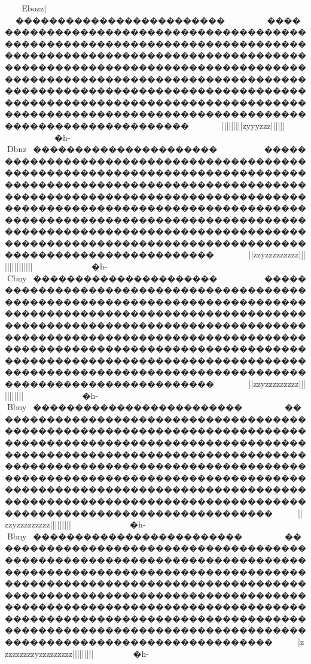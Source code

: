 {{{{{{{{{{{{{{{{{{{{{{{{{{{{{{{{{{{{{{{{{{{{{{{{{{{{{{{{{{{{{{{{{{{{{{{{{{{{{{{{{{{{{{{{{{{{{{{{{{{{{{{{{{{{{{{{{{{{{{{{{{{{{{{{{{{{{{{{{{{{{{{{{{{{{{{{{{{{{{{{{{{{{{{{{{{{{{{{{{{{{{{{{{{{{{{{{{{{{{{{{{{{{{{{{{{{{{{{{{{{{{{{{{{{{{{{{{{{{{{{{{{{{{{{{{{{{{{{{{{{{{{{{{{{{{{{{{{{{{{{{{{{{{{{{{{{{{{{{{{{{{{{{{{{{{{{{{{{{{{
Ebozz|}~~���������������������������������������������������������������������������������������������������������������������������������������������������������������������������������������������������������������������������������������������������������������������������������������������������������������������������������������������������~~~~~}}}||||{{{{{{{{{{{{{{|||||{zyyyzzz{{{{{{{{{{{{{{{{{{{{{||||||{{{{}}}}}}~~~~�h-

Dbnz{}~����������������������������������������������������������������������������������������������������������������������������������������������������������������������������������������������������������������������������������������������������������������������������������������������������������������������������������������������������~~~~~~}}}}}|{{{{{{{{{{{{{{{{{|{{zzyzzzzzzz{{{{{{{{zz{{{|{{{{||||||||||||||}}~~~~~~~~~�h-

Cbny{}~����������������������������������������������������������������������������������������������������������������������������������������������������������������������������������������������������������������������������������������������������������������������������������������������������������������������������������������������������~~~~~~}}}}}|{{{{{{{{{{{{{{{{{|{{zzyzzzzzzz{{{{{{{{zz{{{|{{{{||||||||||}}}}}}~~~~~~~~~�h-

Bbny{~�����������������������������������������������������������������������������������������������������������������������������������������������������������������������������������������������������������������������������������������������������������������������������������������������������������������������������������������������������������~~~~~~}}}}}|{{{{{{{{{{{{{{{{{|{{zzyzzzzzzz{{{{{{{{zz{{{|{{{{}}||||||||}}}}}}~~~~~~~~~�h-

Bbny{~�����������������������������������������������������������������������������������������������������������������������������������������������������������������������������������������������������������������������������������������������������������������������������������������������������������������������������������������������������������~~~~~~}}}}}|{{{{{{{{{{{{zzzzz{zzzzyzzzzzzz{{{{{{{{zz{{{|{{{{}}||||||||}}}}}}}~}}}}~~~~�h-
}}}}}}}}}}}}}}}}}}}}}}}}}}}}}}}}}}}}}}}}}}}}}}}}}}}}}}}}}}}}}}}}}}}}}}}}}}}}}}}}}}}}}}}}}}}}}}}}}}}}}}}}}}}}}}}}}}}}}}}}}}}}}}}}}}}}}}}}}}}}}}}}}}}}}}}}}}}}}}}}}}}}}}}}}}}}}}}}}}}}}}}}}}}}}}}}}}}}}}}}}}}}}}}}}}}}}}}}}}}}}}}}}}}}}}}}}}}}}}}}}}}}}}}}}}}}}}}}}}}}}}}}}}}}}}}}}}}}}}}}}}}}}}}}}}}}}}}}}}}}}}}}}}}}}}}}}}}}}}}}}}}}}}}}}}}}}}}}}}}}}}}}}}}}}}}}}}}}}}}}}}}}}}}}}}}}}}}}}}}}}}}}}}}}}}}}}}}}}}}}}}}}}}}}}}}}}}}}}}}}}}}}}}}}}}}}
